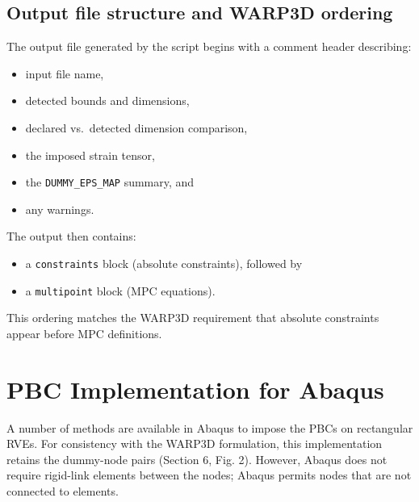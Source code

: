 \documentclass[11pt]{article}
\begin{document}
\subsection{Output file structure and WARP3D ordering}
The output file generated by the script begins with a comment header describing:
\begin{itemize}
\item input file name,
\item detected bounds and dimensions,
\item declared vs.\ detected dimension comparison,
\item the imposed strain tensor,
\item the \texttt{DUMMY\_EPS\_MAP} summary, and
\item any warnings.
\end{itemize}
The output then contains:
\begin{itemize}
\item a \texttt{constraints} block (absolute constraints), followed by
\item a \texttt{multipoint} block (MPC equations).
\end{itemize}
This ordering matches the WARP3D requirement that absolute constraints appear before MPC definitions.


\section{PBC Implementation for Abaqus}
A number of methods are available in Abaqus to impose the PBCs on rectangular RVEs.
For consistency with the WARP3D formulation, this implementation retains 
the dummy-node pairs (Section 6, Fig. 2). However, Abaqus does not 
require rigid-link elements between the nodes; 
Abaqus permits nodes that are not connected to elements.
\end{document}

